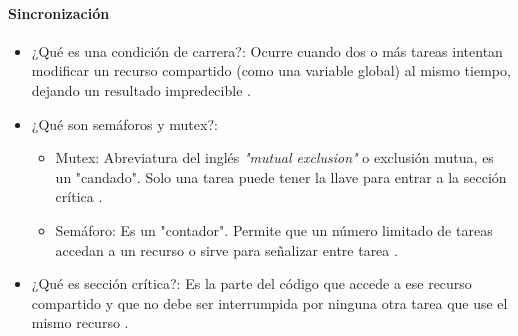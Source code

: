 \paragraph{Sincronización}

\begin{itemize}
    \item ¿Qué es una condición de carrera?: Ocurre cuando dos o más tareas intentan modificar un recurso compartido (como una variable global) al mismo tiempo, dejando un resultado impredecible \cite{pez_2025_sincronizacion}.
    
    \item ¿Qué son semáforos y mutex?:

             \begin{itemize}

               \item Mutex: Abreviatura del inglés \textit{"mutual exclusion" }o exclusión mutua, es un "candado". Solo una tarea puede tener la llave para entrar a la sección crítica \cite{pez_2025_sincronizacion}.
       
               \item Semáforo: Es un "contador". Permite que un número limitado de tareas accedan a un recurso o sirve para señalizar entre tarea \cite{pez_2025_sincronizacion}.
              \end{itemize}

     \item ¿Qué es sección crítica?: Es la parte del código que accede a ese recurso compartido y que no debe ser interrumpida por ninguna otra tarea que use el mismo recurso \cite{sergio_2015_interrupciones} \cite{pez_2025_sincronizacion}.
     
\end{itemize}


